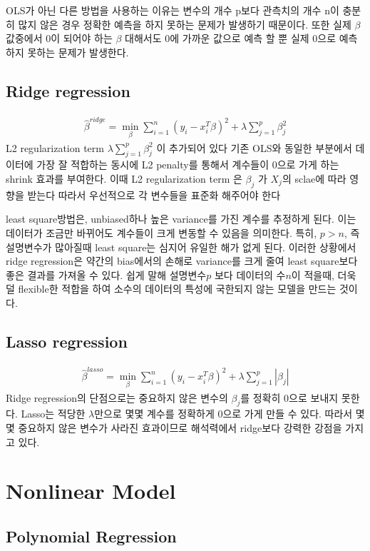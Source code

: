 \documentclass[11pt]{article}
\begin{document}
OLS가 아닌 다른 방법을 사용하는 이유는 변수의 개수 p보다 관측치의 개수 n이 충분히 많지 않은 경우 정확한 예측을 하지 못하는 문제가 발생하기 때문이다. 또한 실제 $\beta$값중에서 0이 되어야 하는 $\beta$ 대해서도 0에 가까운 값으로 예측 할 뿐 실제 0으로 예측하지 못하는 문제가 발생한다.

\subsection{Ridge regression}
  \begin{align}
    \hat{\beta}^{ridge} = \min_{\beta} \sum\limits_{i=1}^n (y_{i} - x_{i}^T \beta)^2 + \lambda \sum\limits_{j=1}^p \beta_{j}^2
  \end{align}
L2 regularization term $\lambda \sum\limits_{j=1}^p \beta_{j}^2$ 이 추가되어 있다 기존 OLS와 동일한 부분에서 데이터에 가장 잘 적합하는 동시에 L2 penalty를 통해서 계수들이 0으로 가게 하는 shrink 효과를 부여한다. 이때 L2 regularization term 은 $\beta_{j}$ 가 $X_{j}$의 sclae에 따라 영향을 받는다 따라서 우선적으로 각 변수들을 표준화 해주어야 한다 

least square방법은, unbiased하나 높은 variance를 가진 계수를 추정하게 된다. 이는 데이터가 조금만 바뀌어도 계수들이 크게 변동할 수 있음을 의미한다. 특히, $p>n$, 즉 설명변수가 많아질때 least square는 심지어 유일한 해가 없게 된다. 이러한 상황에서 ridge regression은 약간의 bias에서의 손해로 variance를 크게 줄여 least square보다 좋은 결과를 가져올 수 있다. 쉽게 말해 설명변수$p$ 보다 데이터의 수$n$이 적을때, 더욱 덜 flexible한 적합을 하여 소수의 데이터의 특성에 국한되지 않는 모델을 만드는 것이다.
\subsection{Lasso regression}
  \begin{align}
    \hat{\beta}^{lasso} = \min_{\beta} \sum\limits_{i=1}^n (y_{i} - x_{i}^T \beta)^2 + \lambda \sum\limits_{j=1}^p |\beta_{j}|
  \end{align}
Ridge regression의 단점으로는 중요하지 않은 변수의 $\beta_{j}$를 정확히 0으로 보내지 못한다. Lasso는 적당한 $\lambda$만으로 몇몇 계수를 정확하게 0으로 가게 만들 수 있다. 따라서 몇몇 중요하지 않은 변수가 사라진 효과이므로 해석력에서 ridge보다 강력한 강점을 가지고 있다. 

\section{Nonlinear Model} 
\subsection{Polynomial Regression}
\end{document}
